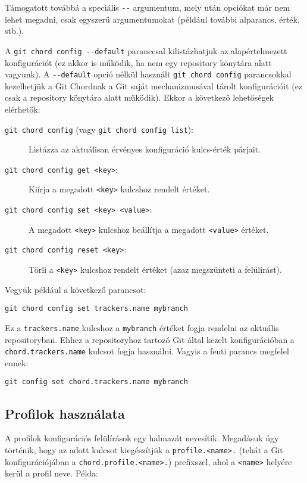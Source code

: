 \documentclass[
]{elteikthesis}[2025/03/25]
\begin{document}
Támogatott továbbá a speciális \verb|--| argumentum, mely után opciókat már nem lehet megadni, csak egyszerű argumentumokat (például további alparancs, érték, stb.).

A \verb|git chord config --default| paranccsal kilistázhatjuk az alapértelmezett konfigurációt
(ez akkor is működik, ha nem egy repository könytára alatt vagyunk).
A \verb|--default| opció nélkül használt \verb|git chord config| parancsokkal kezelhetjük a Git Chordnak a Git saját mechanizmusával tárolt konfigurációit
(ez csak a repository könytára alatt működik).
Ekkor a következő lehetőségek elérhetők:

\begin{description}
    \item[\texttt{git chord config} (vagy \texttt{git chord config list}):]
        Listázza az aktuálisan érvényes konfiguráció kulcs-érték párjait.
    \item[\texttt{git chord config get <key>}:]
        Kiírja a megadott \verb|<key>| kulcshoz rendelt értéket.
    \item[\texttt{git chord config set <key> <value>}:]
        A megadott \verb|<key>| kulcshoz beállítja a megadott \verb|<value>| értéket.
    \item[\texttt{git chord config reset <key>}:]
        Törli a \verb|<key>| kulcshoz rendelt értéket (azaz megszünteti a felülírást).
\end{description}

Vegyük például a következő parancsot:

\begin{verbatim}
git chord config set trackers.name mybranch
\end{verbatim}

Ez a \verb|trackers.name| kulcshoz a \verb|mybranch| értéket fogja rendelni az aktuális repositoryban.
Ehhez a repositoryhoz tartozó Git által kezelt konfigurációban a \verb|chord.trackers.name| kulcsot fogja használni.
Vagyis a fenti parancs megfelel ennek:

\begin{verbatim}
git config set chord.trackers.name mybranch
\end{verbatim}

\subsection{Profilok használata} \label{subsec:profiles}

A profilok konfigurációs felülírások egy halmazát nevesítik.
Megadásuk úgy történik, hogy az adott kulcsot kiegészítjük a \verb|profile.<name>.|
(tehát a Git konfigurációjában a \verb|chord.profile.<name>.|) prefixszel,
ahol a \verb|<name>| helyére kerül a profil neve.
Példa:
\end{document}

